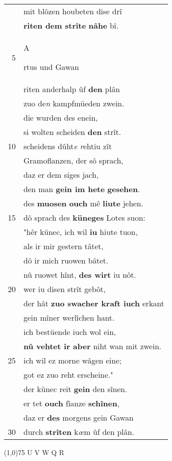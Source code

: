 \documentclass[8pt,a4paper,notitlepage]{article}
\begin{document}
\begin{table}[ht]
\begin{minipage}[t]{0.5\linewidth}
\begin{tabular}{rl}
 & mit blôzen houbeten dise drî\\ 
 & \textbf{riten dem strîte} \textbf{nâhe} bî.\\ 
5 & \begin{large}A\end{large}rtus und Gawan\\ 
 & riten anderhalp ûf \textbf{den} plân\\ 
 & zuo de\textit{n} kampfmüeden zwein.\\ 
 & die wurden des enein,\\ 
 & si wolten scheiden \textbf{den} strît.\\ 
10 & scheidens dûht\textit{e} \textit{r}ehtiu zît\\ 
 & Gramoflanzen, der sô sprach,\\ 
 & daz er dem siges jach,\\ 
 & den man \textbf{gein im hete} \textbf{gesehen}.\\ 
 & des \textbf{muosen} \textbf{ouch} mê \textbf{liute} jehen.\\ 
15 & dô sprach des \textbf{küneges} Lotes suon:\\ 
 & "hêr künec, ich wil \textbf{iu} hiute tuon,\\ 
 & als ir mir gestern tâtet,\\ 
 & dô ir mich ruowen bâtet.\\ 
 & nû ruowet hînt, \textbf{des wirt} iu nôt.\\ 
20 & wer iu disen strît gebôt,\\ 
 & der hât \textbf{zuo swacher kraft iuch} erkant\\ 
 & gein mîner werlîchen hant.\\ 
 & ich bestüende iuch wol ein,\\ 
 & \textbf{nû vehtet ir aber} niht wan mit zwein.\\ 
25 & ich wil ez morne wâgen eine;\\ 
 & got ez zuo reht erscheine."\\ 
 & der künec reit \textbf{gein} den sînen.\\ 
 & er tet \textbf{ouch} fîanze \textbf{schînen},\\ 
 & daz er \textbf{des} morgens gein Gawan\\ 
30 & durch \textbf{strîten} k\textit{œ}m ûf den plân.\\ 
\end{tabular}
\scriptsize
\line(1,0){75} \newline
U V W Q R \newline

\end{minipage}
\end{table}
\end{document}
